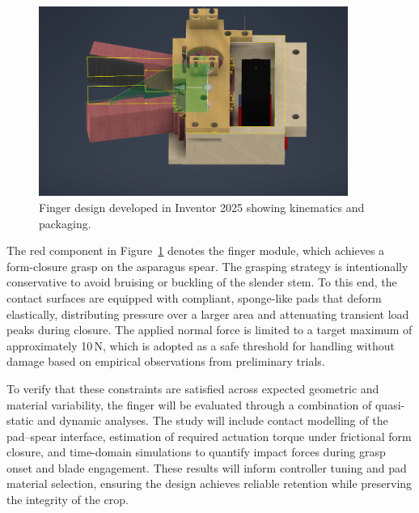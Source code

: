 \begin{figure}[H]
    \centering
    \includegraphics[width=0.9\textwidth]{finger_design_inventor.png}
    \caption{Finger design developed in Inventor 2025 showing kinematics and packaging.}
    \label{fig:finger_inventor}
    \end{figure}








The red component in Figure~\ref{fig:finger_inventor} denotes the finger module, which achieves a
form-closure grasp on the asparagus spear. The grasping strategy is intentionally conservative to
avoid bruising or buckling of the slender stem. To this end, the contact surfaces are equipped with
compliant, sponge-like pads that deform elastically, distributing pressure over a larger area and
attenuating transient load peaks during closure. The applied normal force is limited to a target
maximum of approximately 10\,N, which is adopted as a safe threshold for handling without damage
based on empirical observations from preliminary trials.

To verify that these constraints are satisfied across expected geometric and material variability, the
finger will be evaluated through a combination of quasi-static and dynamic analyses. The study will
include contact modelling of the pad–spear interface, estimation of required actuation torque under
frictional form closure, and time-domain simulations to quantify impact forces during grasp onset and
blade engagement. These results will inform controller tuning and pad material selection, ensuring the
design achieves reliable retention while preserving the integrity of the crop.



